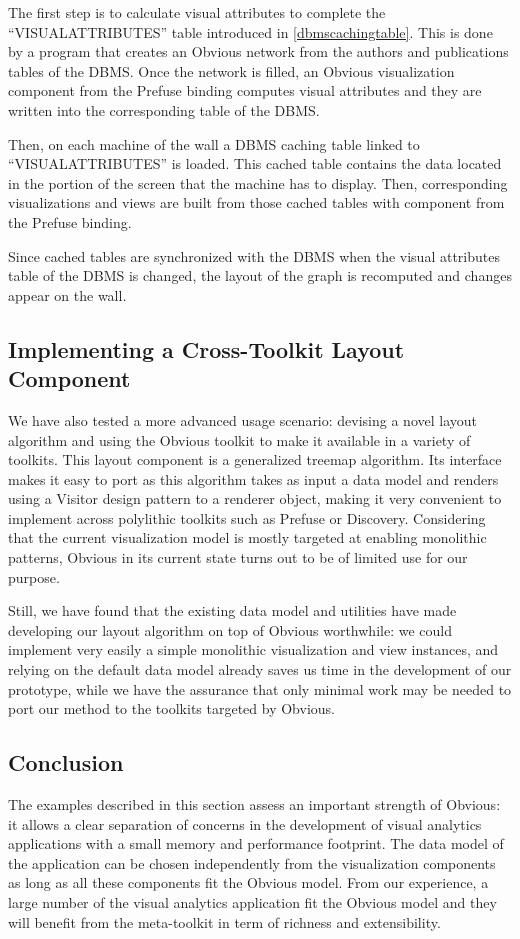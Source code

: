 The first step is to calculate visual attributes to complete the
``VISUALATTRIBUTES'' table introduced in \ref{dbmscachingtable}.
This is done by a program that creates an Obvious network from
the authors and publications tables of the DBMS. Once the network is filled,
an Obvious visualization component from the Prefuse binding computes visual
attributes and they are written into the corresponding table of the
DBMS.

Then, on each machine of the wall a DBMS caching table linked to
``VISUALATTRIBUTES'' is loaded. This cached table contains the data
located in the portion of the screen that the machine has to display.
Then, corresponding visualizations and views are built from those
cached tables with component from the Prefuse binding.

Since cached tables are synchronized with the DBMS when the visual
attributes table of the DBMS is changed, the layout of the graph is
recomputed and changes appear on the wall.

\subsection{Implementing a Cross-Toolkit Layout Component}

We have also tested a more advanced usage scenario: devising
a novel layout algorithm and using the Obvious toolkit to make it
available in a variety of toolkits. This layout component is a
generalized treemap algorithm.
Its interface makes it easy to port as this
algorithm takes as input a data model and renders using a Visitor
design pattern to a renderer object, making it very convenient to
implement across polylithic toolkits such as Prefuse or Discovery.
Considering that the current visualization model is mostly targeted at
enabling monolithic patterns, Obvious in its current state turns out
to be of limited use for our purpose.

Still, we have found that the existing data model and utilities have
made developing our layout algorithm on top of Obvious worthwhile: we
could implement very easily a simple monolithic visualization and
view instances, and relying on the default data model already saves us
time in the development of our prototype, while we have the assurance
that only minimal work may be needed to port our method to the
toolkits targeted by Obvious.


\subsection{Conclusion}

The examples described in this section assess an important strength of
Obvious: it allows a clear separation of concerns in the development
of visual analytics applications with a small memory and performance
footprint.  The data model of the application can be chosen
independently from the visualization components as long as all these
components fit the Obvious model.  From our experience, a large number
of the visual analytics application fit the Obvious model and they
will benefit from the meta-toolkit in term of richness and
extensibility.

